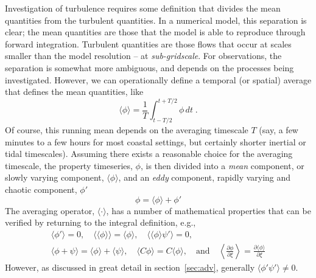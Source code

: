 \documentclass[11pt]{report}
\numberwithin{equation}{section}
\begin{document}
Investigation of turbulence requires some definition that divides the mean quantities from the turbulent quantities.  In a numerical model, this separation is clear; the mean quantities are those that the model is able to reproduce through forward integration.  Turbulent quantities are those flows that occur at scales smaller than the model resolution -- at \emph{sub-gridscale}.  For observations, the separation is somewhat more ambiguous, and depends on the processes being investigated.  However, we can operationally define a temporal (or spatial) average that defines the mean quantities, like
\begin{equation}
    \langle \phi \rangle = \frac{1}{T}\int_{t-T/2}^{t+T/2} \phi \, dt \; .
\end{equation}
Of course, this running mean depends on the averaging timescale $T$ (say, a few minutes to a few hours for most coastal settings, but certainly shorter inertial or tidal timescales).  Assuming there exists a reasonable choice for the averaging timescale, the property timeseries, $\phi$, is then divided into a \emph{mean} component, or slowly varying component, $\langle \phi \rangle$, and an \emph{eddy} component, rapidly varying and chaotic component, $\phi'$
\begin{equation}
    \phi = \langle \phi \rangle + \phi'
\end{equation}
The averaging operator, $\langle \cdot \rangle$, has a number of mathematical properties that can be verified by returning to the integral definition, e.g.,
\begin{eqnarray}
    \langle \phi' \rangle = 0, \quad 
    \langle\langle \phi \rangle\rangle = \langle \phi \rangle, \quad
    \langle \langle \phi \rangle \psi' \rangle  = 0, \quad \\
    \langle \phi  + \psi \rangle  = \langle \phi \rangle  + \langle \psi \rangle, \quad
    \langle C \phi \rangle = C \langle \phi \rangle, \quad \mathrm{and} \quad
    \left\langle \frac{\partial \phi}{\partial \xi} \right\rangle = \frac{\partial \langle \phi \rangle}{\partial \xi} 
\end{eqnarray}
However, as discussed in great detail in section~\ref{sec:adv}, generally $\langle \phi' \psi' \rangle \ne 0$.
\end{document}

